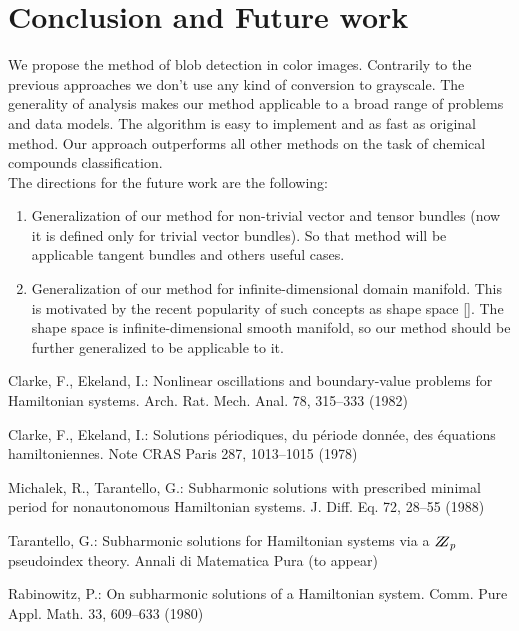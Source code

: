 \documentclass{llncs}
\begin{document}
\section{Conclusion and Future work}
We propose the method of blob detection in color images. Contrarily to the previous approaches we don’t use any kind of conversion to grayscale. The generality of analysis makes our method applicable to a broad range of problems and data models. The algorithm is easy to implement and as fast as original method. Our approach outperforms all other methods on the task of chemical compounds classification.
\\
The directions for the future work are the following:
\begin{enumerate}
\item Generalization of our method for non-trivial vector and tensor bundles (now it is defined only for trivial vector bundles). So that method will be applicable tangent bundles and others useful cases.
\item Generalization of our method for infinite-dimensional domain manifold. This is motivated by the recent popularity of such concepts as shape space []. The shape space is infinite-dimensional smooth manifold, so our method should be further generalized to be applicable to it.
\end{enumerate}

\begin{thebibliography}{5}
%
Clarke, F., Ekeland, I.:
Nonlinear oscillations and
boundary-value problems for Hamiltonian systems.
Arch. Rat. Mech. Anal. 78, 315--333 (1982)

Clarke, F., Ekeland, I.:
Solutions p\'{e}riodiques, du
p\'{e}riode donn\'{e}e, des \'{e}quations hamiltoniennes.
Note CRAS Paris 287, 1013--1015 (1978)

Michalek, R., Tarantello, G.:
Subharmonic solutions with prescribed minimal period for nonautonomous Hamiltonian systems.
J. Diff. Eq. 72, 28--55 (1988)

Tarantello, G.:
Subharmonic solutions for Hamiltonian
systems via a $\bbbz_{p}$ pseudoindex theory.
Annali di Matematica Pura (to appear)

Rabinowitz, P.:
On subharmonic solutions of a Hamiltonian system.
Comm. Pure Appl. Math. 33, 609--633 (1980)

\end{thebibliography}
\end{document}
